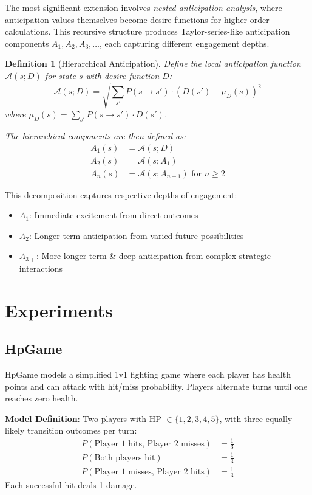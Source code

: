 \documentclass{article}
\newtheorem{definition}{Definition}
\begin{document}
The most significant extension involves \emph{nested anticipation analysis}, where anticipation values themselves become desire functions for higher-order calculations. This recursive structure produces Taylor-series-like anticipation components $A_1, A_2, A_3, \ldots$, each capturing different engagement depths.

\begin{definition}[Hierarchical Anticipation]
Define the local anticipation function $\mathcal{A}(s; D)$ for state $s$ with desire function $D$:
\begin{equation}
\mathcal{A}(s; D) = \sqrt{\sum_{s'} P(s \to s') \cdot (D(s') - \mu_D(s))^2}
\end{equation}
where $\mu_D(s) = \sum_{s'} P(s \to s') \cdot D(s')$.

The hierarchical components are then defined as:
\begin{align}
A_1(s) &= \mathcal{A}(s; D) \\
A_2(s) &= \mathcal{A}(s; A_1) \\
A_n(s) &= \mathcal{A}(s; A_{n-1}) \text{ for } n \geq 2
\end{align}
\end{definition}

This decomposition captures respective depths of engagement:
\begin{itemize}
\item $A_1$: Immediate excitement from direct outcomes
\item $A_2$: Longer term anticipation from varied future possibilities
\item $A_{3+}$: More longer term \& deep anticipation from complex strategic interactions
\end{itemize}

\section{Experiments}
\subsection{HpGame}

HpGame models a simplified 1v1 fighting game where each player has health points and can attack with hit/miss probability. Players alternate turns until one reaches zero health.

\textbf{Model Definition}: Two players with HP $\in \{1,2,3,4,5\}$, with three equally likely transition outcomes per turn:
\begin{align}
P(\text{Player 1 hits, Player 2 misses}) &= \frac{1}{3} \\
P(\text{Both players hit}) &= \frac{1}{3} \\
P(\text{Player 1 misses, Player 2 hits}) &= \frac{1}{3}
\end{align}
Each successful hit deals 1 damage.
\end{document}
